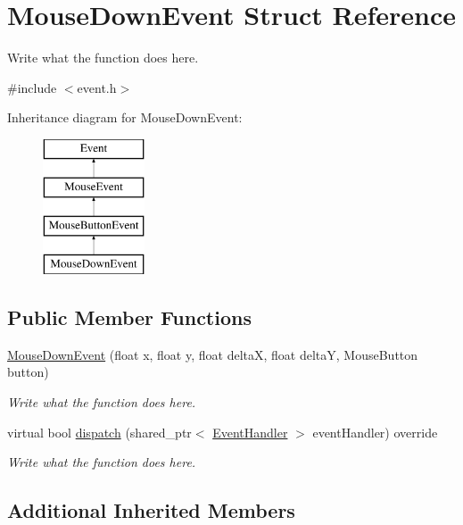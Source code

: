 \hypertarget{structMouseDownEvent}{\section{Mouse\+Down\+Event Struct Reference}
\label{structMouseDownEvent}
}


Write what the function does here.  




{\ttfamily \#include $<$event.\+h$>$}

Inheritance diagram for Mouse\+Down\+Event\+:\begin{figure}[H]
\begin{center}
\leavevmode
\includegraphics[height=4.000000cm]{structMouseDownEvent}
\end{center}
\end{figure}
\subsection*{Public Member Functions}
\begin{DoxyCompactItemize}
\item 
\hyperlink{structMouseDownEvent_a297d7e50d7363addef438a1a7e0981a8}{Mouse\+Down\+Event} (float x, float y, float delta\+X, float delta\+Y, Mouse\+Button button)
\begin{DoxyCompactList}\small\item\em Write what the function does here. \end{DoxyCompactList}\item 
virtual bool \hyperlink{structMouseDownEvent_a4c3d79107e6cef049a76089fd2b5b431}{dispatch} (shared\+\_\+ptr$<$ \hyperlink{structEventHandler}{Event\+Handler} $>$ event\+Handler) override
\begin{DoxyCompactList}\small\item\em Write what the function does here. \end{DoxyCompactList}\end{DoxyCompactItemize}
\subsection*{Additional Inherited Members}


